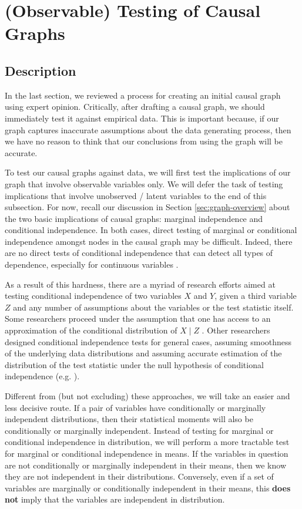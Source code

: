 \section{(Observable) Testing of Causal Graphs}
\label{sec:graph-testing}

\subsection{Description}
In the last section, we reviewed a process for creating an initial causal graph using expert opinion.
Critically, after drafting a causal graph, we should immediately test it against empirical data.
This is important because, if our graph captures inaccurate assumptions about the data generating process, then we have no reason to think that our conclusions from using the graph will be accurate.

To test our causal graphs against data, we will first test the implications of our graph that involve observable variables only.
We will defer the task of testing implications that involve unobserved / latent variables to the end  of this subsection.
For now, recall our discussion in Section \ref{sec:graph-overview} about the two basic implications of causal graphs: marginal independence and conditional independence.
In both cases, direct testing of marginal or conditional independence amongst nodes in the causal graph may be difficult.
Indeed, there are no direct tests of conditional independence that can detect all types of dependence, especially for continuous variables \citep{bergsma_2004_testing, shah_2020_hardness}.

As a result of this hardness, there are a myriad of research efforts aimed at testing conditional independence of two variables $X$ and $Y$, given a third variable $Z$ and any number of assumptions about the variables or the test statistic itself.
Some researchers proceed under the assumption that one has access to an approximation of the conditional distribution of $X \mid Z$ \citep{candes_2018_panning, berrett_2019_conditional}.
Other researchers designed conditional independence tests for general cases, assuming smoothness of the underlying data distributions and assuming accurate estimation of the distribution of the test statistic under the null hypothesis of conditional independence (e.g. \citet{zhang_2012_kernel, strobl_2019_approximate}).

Different from (but not excluding) these approaches, we will take an easier and less decisive route.
If a pair of variables have conditionally or marginally independent distributions, then their statistical moments will also be conditionally or marginally independent.
Instead of testing for marginal or conditional independence in distribution, we will perform a more tractable test for marginal or conditional independence in means.
If the variables in question are not conditionally or marginally independent in their means, then we know they are not independent in their distributions.
Conversely, even if a set of variables are marginally or conditionally independent in their means, this \textbf{does not} imply that the variables are independent in distribution.

